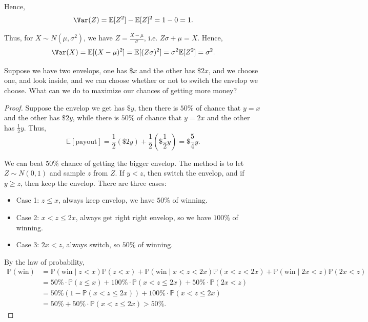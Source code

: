 Hence,
\[
    \Var(Z) = \mathbb{E} [Z^2] - \mathbb{E} [Z]^2 = 1 - 0 = 1.
\]

Thus, for \(X \sim N(\mu , \sigma ^2)\), we have \(Z = \frac{X - \mu}{\sigma }\), i.e. \(Z \sigma + \mu = X\). Hence,
\[
    \Var(X) = \mathbb{E} [(X - \mu)^2] = \mathbb{E} [(Z \sigma )^2] = \sigma ^2 \mathbb{E} [Z^2] = \sigma ^2.
\]   

\begin{eg}
    Suppose we have two envelops, one has \(\$ x\) and the other has \(\$ 2x\), and we choose one, and look inside, and we can choose whether or not to switch the envelop we choose. What can we do to maximize our chances of getting more money?  
\end{eg}

\begin{proof}
    Suppose the envelop we get has \(\$ y\), then there is \(50 \%\) of chance that \(y = x\) and the other has \(\$ 2y\), while there is \(50 \%\) of chance that \(y = 2x\) and the other has \(\frac{1}{2} y\). Thus,
    \[
        \mathbb{E} [\text{payout} ] = \frac{1}{2} (\$2y) + \frac{1}{2} (\$ \frac{1}{2} y) = \$ \frac{5}{4} y.
    \]       

    We can beat \(50 \%\) chance of getting the bigger envelop. The method is to let \(Z \sim N(0, 1)\) and sample \(z\) from \(Z\). If \(y < z\), then switch the envelop, and if \(y \ge z\), then keep the envelop. There are three cases:
    \begin{itemize}
        \item Case 1: \(z \le x\), always keep envelop, we have \(50 \%\) of winning. 
        \item Case 2: \(x < z \le 2x\), always get right right envelop, so we have \(100 \%\) of winning.  
        \item Case 3: \(2x < z\), always switch, so \(50\%\) of winning.    
    \end{itemize}  
    By the law of probability,
    \begin{align*}
        \mathbb{P} (\text{win} ) &= \mathbb{P} (\text{win} \mid z < x ) \mathbb{P} (z < x) + \mathbb{P} (\text{win} \mid x < z < 2x ) \mathbb{P} (x < z < 2x) + \mathbb{P} (\text{win} \mid 2x < z ) \mathbb{P} (2x < z) \\
        &= 50 \% \cdot \mathbb{P} (z \le x) + 100 \% \cdot \mathbb{P} (x < z \le 2x) + 50 \% \cdot \mathbb{P} (2x < z) \\
        &= 50 \% (1 - \mathbb{P} (x < z \le 2x)) + 100 \% \cdot \mathbb{P} (x < z \le 2x) \\
        &= 50\% + 50 \% \cdot \mathbb{P} (x < z \le 2x) > 50 \%.
    \end{align*}
\end{proof}

